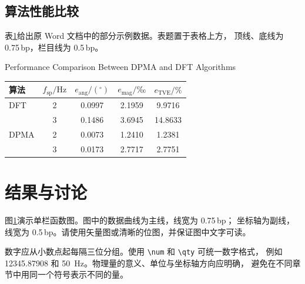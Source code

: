 \documentclass{csee}
\begin{document}
\subsection{算法性能比较}
表\ref{tab:comparison}给出原 Word 文档中的部分示例数据。表题置于表格上方，
顶线、底线为 0.75\,bp，栏目线为 0.5\,bp。
\begin{table}[htbp]
  \centering
    {Performance Comparison Between DPMA and DFT Algorithms}
  \label{tab:comparison}
  \begin{tabular*}{\columnwidth}{@{\extracolsep{\fill}}lcccc@{}}
    \toprule
    算法 & $f_{\mathrm{sp}}/\mathrm{Hz}$ & $e_{\mathrm{ang}}/(^{\circ})$
      & $e_{\mathrm{mag}}/\text{‰}$ & $e_{\mathrm{TVE}}/\%$ \\
    \midrule
    DFT & 2 & \num{0.0997} & \num{2.1959} & \num{9.9716} \\
        & 3 & \num{0.1486} & \num{3.6945} & \num{14.8633} \\
    \midrule
    DPMA & 2 & \num{0.0073} & \num{1.2410} & \num{1.2381} \\
         & 3 & \num{0.0173} & \num{2.7717} & \num{2.7751} \\
    \bottomrule
  \end{tabular*}
\end{table}

\section{结果与讨论}
图\ref{fig:signal}演示单栏函数图。图中的数据曲线为主线，线宽为 0.75\,bp；
坐标轴为副线，线宽为 0.5\,bp。请使用矢量图或清晰的位图，并保证图中文字可读。
\begin{figure}[htbp]
  \centering
  \label{fig:signal}
\end{figure}

数字应从小数点起每隔三位分组。使用 \verb|\num| 和 \verb|\qty| 可统一数字格式，
例如 \num{12345.87908} 和 \qty{50}{\hertz}。物理量的意义、单位与坐标轴方向应明确，
避免在不同章节中用同一个符号表示不同的量。
\end{document}
